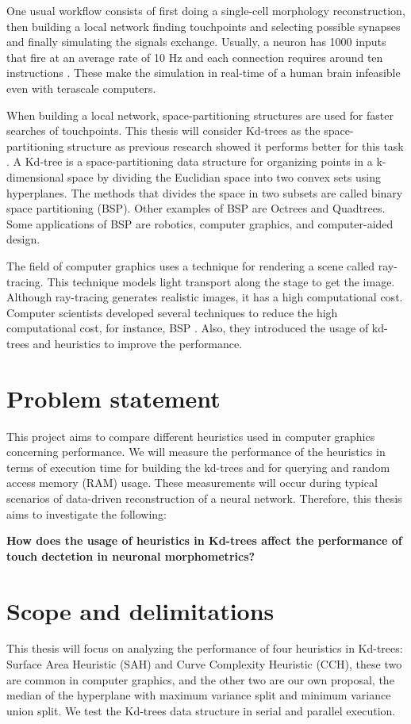 One usual workflow consists of first doing a single-cell morphology reconstruction, then building a local network finding touchpoints and selecting possible synapses \cite{Reimann2015-ys} and finally simulating the signals exchange. Usually, a neuron has 1000 inputs that fire at an average rate of 10 Hz and each connection requires around ten instructions \cite{Furber2006}. These make the simulation in real-time of a human brain infeasible even with terascale computers.

When building a local network, space-partitioning structures are used for faster searches of touchpoints. This thesis will consider Kd-trees as the space-partitioning structure as previous research showed it performs better for this task \cite{Adamsson_Vorkapic_2016}. A Kd-tree is a space-partitioning data structure for organizing points in a k-dimensional space by dividing the Euclidian space into two convex sets using hyperplanes. The methods that divides the space in two subsets are called binary space partitioning (BSP). Other examples of BSP are Octrees and Quadtrees. Some applications of BSP are robotics, computer graphics, and computer-aided design.

The field of computer graphics uses a technique for rendering a scene called ray-tracing. This technique models light transport along the stage to get the image. Although ray-tracing generates realistic images, it has a high computational cost. Computer scientists developed several techniques to reduce the high computational cost, for instance, BSP \cite{Fuchs1980}. Also, they introduced the usage of kd-trees and heuristics to improve the performance\cite{WaldHavran06, Yucheng, LinjiaSaeidMajid, Bentley, 7169256}.

\section{Problem statement}
This project aims to compare different heuristics used in computer graphics concerning performance. We will measure the performance of the heuristics in terms of execution time for building the kd-trees and for querying and random access memory (RAM) usage. These measurements will occur during typical scenarios of data-driven reconstruction of a neural network. Therefore, this thesis aims to investigate the following:

\textbf{How does the usage of heuristics in Kd-trees affect the performance of touch dectetion in neuronal morphometrics? }

\section{Scope and delimitations}
This thesis will focus on analyzing the performance of four heuristics in Kd-trees: Surface Area Heuristic (SAH) and Curve Complexity Heuristic (CCH), these two are common in computer graphics, and the other two are our own proposal, the median of the hyperplane with maximum variance split and minimum variance union split. We test the Kd-trees data structure in serial and parallel execution.

